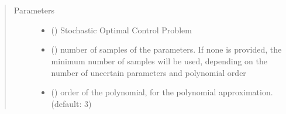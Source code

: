 \documentclass[letterpaper,10pt,english]{sphinxmanual}
\begin{document}
\begin{fulllineitems}
\label{\detokenize{yaocptool.stochastic:yaocptool.stochastic.pce.PCEConverter}}~

\begin{fulllineitems}
\label{\detokenize{yaocptool.stochastic:yaocptool.stochastic.pce.PCEConverter.__init__}}~\begin{quote}\begin{description}
\item[{Parameters}] \leavevmode\begin{itemize}
\item {} 
 ({\hyperref[\detokenize{yaocptool.modelling:yaocptool.modelling.stochastic_ocp.StochasticOCP}]{}}) \textendash{} Stochastic Optimal Control Problem

\item {} 
 () \textendash{} number of samples of the parameters. If none is provided, the minimum number of samples
will be used, depending on the number of uncertain parameters and polynomial order

\item {} 
 () \textendash{} order of the polynomial, for the polynomial approximation. (default: 3)

\end{itemize}

\end{description}\end{quote}

\end{fulllineitems}


\begin{fulllineitems}
\label{\detokenize{yaocptool.stochastic:yaocptool.stochastic.pce.PCEConverter.convert_socp_to_ocp_with_pce}}
\end{fulllineitems}


\end{fulllineitems}
\end{document}
